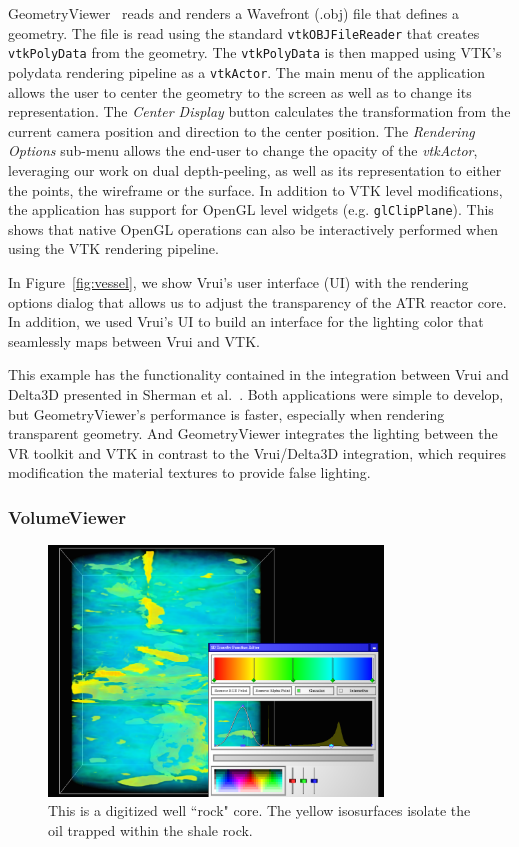 GeometryViewer~\cite{GeometryViewer} reads and renders a Wavefront (.obj) file that defines a geometry.
The file is read using the standard \texttt{vtkOBJFileReader} that creates \texttt{vtkPolyData} from the geometry.
The \texttt{vtkPolyData} is then mapped using VTK's polydata rendering pipeline as a \texttt{vtkActor}.
The main menu of the application allows the user to center the geometry to the screen as well as to change its representation.
The \textit{Center Display} button calculates the transformation from the current camera position and direction to the center position.
The \textit{Rendering Options} sub-menu allows the end-user to change the opacity of the \textit{vtkActor}, leveraging our work on dual depth-peeling, as well as its representation to either the points, the wireframe or the surface.
In addition to VTK level modifications, the application has support for OpenGL level widgets (e.g. \texttt{glClipPlane}).
This shows that native OpenGL operations can also be interactively performed when using the VTK rendering pipeline.

In Figure~\ref{fig:vessel}, we show Vrui's user interface (UI) with the rendering options dialog that allows us to adjust the transparency of the ATR reactor core. In addition, we used Vrui's UI to build an interface for the lighting color that seamlessly maps between Vrui and VTK.

This example has the functionality contained in the integration between Vrui and Delta3D presented in Sherman et al.~\cite{Sherman:2010}. Both applications were simple to develop, but GeometryViewer's  performance is faster, especially when rendering transparent geometry. And GeometryViewer integrates the lighting between the VR toolkit and VTK in contrast to the Vrui/Delta3D integration, which requires modification the material textures to provide false lighting.

\subsubsection{VolumeViewer}

\begin{figure}[h!]
 \centering
 \includegraphics[width=3.5in]{images/rock-transferfunction.png}
 \caption{This is a digitized well ``rock" core. The yellow isosurfaces isolate the oil trapped within the shale rock.}
 \label{fig:volume}
\end{figure}

